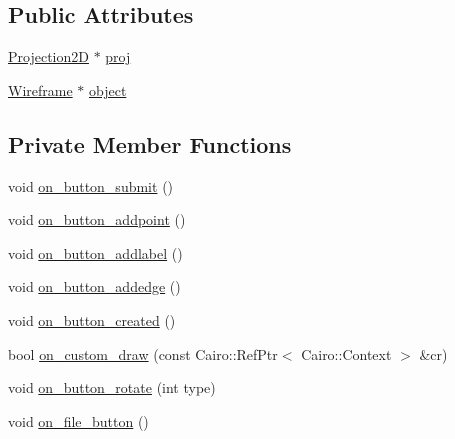 \subsection*{Public Attributes}
\begin{DoxyCompactItemize}
\item 
\hyperlink{class_projection2_d}{Projection2D} $\ast$ \hyperlink{class_construct_window_a1c4f16b6dbb43569a8aa2c992b13950d}{proj}
\item 
\hyperlink{class_wireframe}{Wireframe} $\ast$ \hyperlink{class_construct_window_adc9531aab11327949db243959a44ac10}{object}
\end{DoxyCompactItemize}
\subsection*{Private Member Functions}
\begin{DoxyCompactItemize}
\item 
void \hyperlink{class_construct_window_a5dcaf37144ff4fc628256e77a9960577}{on\+\_\+button\+\_\+submit} ()
\item 
void \hyperlink{class_construct_window_a8842011425ba1b731a4dae5d967a5ffd}{on\+\_\+button\+\_\+addpoint} ()
\item 
void \hyperlink{class_construct_window_a3cb10b090a414f412670a3caf2cc6269}{on\+\_\+button\+\_\+addlabel} ()
\item 
void \hyperlink{class_construct_window_aea4ae0b05b660bbaf1bf808822d851cc}{on\+\_\+button\+\_\+addedge} ()
\item 
void \hyperlink{class_construct_window_a41da466f959938ac1f8bee034ab94b01}{on\+\_\+button\+\_\+created} ()
\item 
bool \hyperlink{class_construct_window_a207140b364fbc6412fa488fd78c11071}{on\+\_\+custom\+\_\+draw} (const Cairo\+::\+Ref\+Ptr$<$ Cairo\+::\+Context $>$ \&cr)
\item 
void \hyperlink{class_construct_window_ae4f9ac332fbef78298b93379b8b9b8df}{on\+\_\+button\+\_\+rotate} (int type)
\item 
void \hyperlink{class_construct_window_abb4ff002be0d1bdbe09fda5852b43ccd}{on\+\_\+file\+\_\+button} ()
\end{DoxyCompactItemize}
